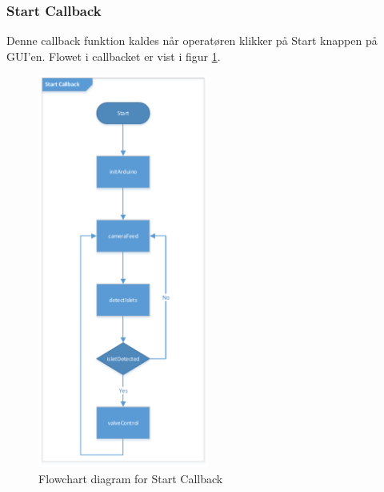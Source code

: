 \subsubsection{Start Callback}
Denne callback funktion kaldes når operatøren klikker på Start knappen på GUI'en. Flowet i callbacket er vist i figur \ref{fig:act_start}.
\begin{figure}[H]
	\centering
	\includegraphics[width=0.5\textwidth]{billeder/act_start-crop.pdf}
	\caption{Flowchart diagram for Start Callback}
	\label{fig:act_start}
\end{figure}

\newpage
